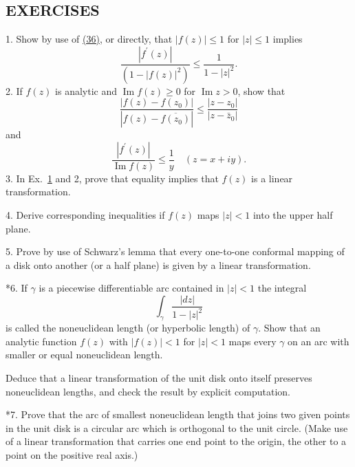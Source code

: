 \subsection*{EXERCISES}
1. Show by use of \hyperref[eq:4.36]{(36)}, or directly, that $|f(z)| \leq 1$ for $|z| \leq 1$ implies
\begin{equation*}
\frac {\left| f ^ {\prime} (z) \right|}{(1 - | f (z) | ^ {2})} \leq \frac {1}{1 - | z | ^ {2}}.
\end{equation*}
2. If $f(z)$ is analytic and $\operatorname{Im} f(z) \geq 0$ for $\operatorname{Im} z > 0$, show that
\begin{equation*}
\frac {\left| f (z) - f \left(z _ {0}\right) \right|}{\left| f (z) - \overline {{{f \left(z _ {0}\right)}}} \right|} \leq \frac {\left| z - z _ {0} \right|}{\left| z - \bar {z} _ {0} \right|}
\end{equation*}
and
\begin{equation*}
\frac {| f ^ {\prime} (z) |}{\operatorname{Im} f (z)} \leq \frac {1}{y} \quad (z = x + i y).
\end{equation*}
3. In Ex.~\hyperref[exercise:4.3.4.7.1]{1} and 2, prove that equality implies that $f(z)$ is a linear transformation.

4. Derive corresponding inequalities if $f(z)$ maps $|z| < 1$ into the upper half plane.

5. Prove by use of Schwarz's lemma that every one-to-one conformal mapping of a disk onto another (or a half plane) is given by a linear transformation.

*6. If $\gamma$ is a piecewise differentiable arc contained in $|z| < 1$ the integral
\begin{equation*}
\int_ {\gamma} \frac {| d z |}{1 - | z | ^ {2}}
\end{equation*}
is called the noneuclidean length (or hyperbolic length) of $\gamma$. Show that an analytic function $f(z)$ with $|f(z)| < 1$ for $|z| < 1$ maps every $\gamma$ on an arc with smaller or equal noneuclidean length.

Deduce that a linear transformation of the unit disk onto itself preserves noneuclidean lengths, and check the result by explicit computation.

*7. Prove that the arc of smallest noneuclidean length that joins two given points in the unit disk is a circular arc which is orthogonal to the unit circle. (Make use of a linear transformation that carries one end point to the origin, the other to a point on the positive real axis.)

